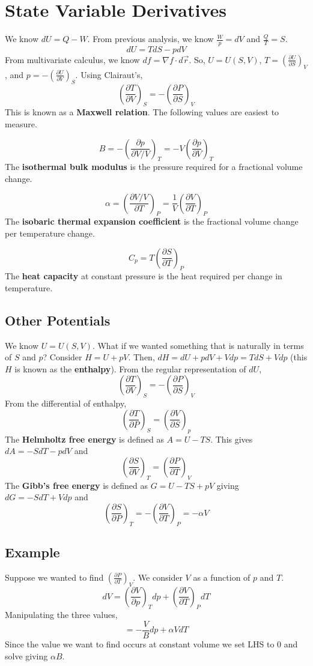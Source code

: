 \documentclass[../main.tex]{subfiles}
\begin{document}
\section{State Variable Derivatives}
We know $dU=Q-W$. From previous analysis, we know $\frac{W}{p}=dV$ and $\frac{Q}{T}=S$.
$$dU=TdS-pdV$$
From multivariate calculus, we know $df=\nabla f\cdot d\vec{r}$. So, $U=U(S,V)$,
$T=\left(\frac{\partial U}{\partial S}\right)_{V}$, and $p=-\left(\frac{\partial U}{\partial V}\right)_{S}$.
Using Clairaut's,
$$\left(\frac{\partial T}{\partial V}\right)_{S}=-\left(\frac{\partial P}{\partial S}\right)_{V}$$
This is known as a \textbf{Maxwell relation}. The following values are easiest to measure.

$$B=-\left(\frac{\partial p}{\partial V/V}\right)_{T}=-V\left(\frac{\partial p}{\partial V}\right)_{T}$$
The \textbf{isothermal bulk modulus} is the pressure required for a fractional volume change.

$$\alpha=\left(\frac{\partial V/V}{\partial T}\right)_{P}=\frac{1}{V}\left(\frac{\partial V}{\partial T}\right)_{P}$$
The \textbf{isobaric thermal expansion coefficient} is the fractional volume change per temperature change.

$$C_{p}=T\left(\frac{\partial S}{\partial T}\right)_{P}$$
The \textbf{heat capacity} at constant pressure is the heat required per change in temperature.

\subsection{Other Potentials}
We know $U=U(S,V)$. What if we wanted something that is naturally in terms of $S$ and $p$? Consider
$H=U+pV$. Then, $dH=dU+pdV+Vdp=TdS+Vdp$ (this $H$ is known as the \textbf{enthalpy}). From the regular representation of $dU$, 
$$\left(\frac{\partial T}{\partial V}\right)_{S}=-\left(\frac{\partial P}{\partial S}\right)_{V}$$
From the differential of enthalpy,
$$\left(\frac{\partial T}{\partial P}\right)_{S}=\left(\frac{\partial V}{\partial S}\right)_{p}$$
The \textbf{Helmholtz free energy} is defined as $A=U-TS$. This gives $dA=-SdT-pdV$ and
$$\left(\frac{\partial S}{\partial V}\right)_{T}=\left(\frac{\partial P}{\partial T}\right)_{V}$$
The \textbf{Gibb's free energy} is defined as $G=U-TS+pV$ giving $dG=-SdT+Vdp$ and
$$\left(\frac{\partial S}{\partial P}\right)_{T}=-\left(\frac{\partial V}{\partial T}\right)_{P}=-\alpha V$$

\subsection{Example}
Suppose we wanted to find $\left(\frac{\partial P}{\partial T}\right)_{V}$. We consider $V$ as a function of $p$ and $T$.
$$dV=\left(\frac{\partial V}{\partial p}\right)_{T}dp+\left(\frac{\partial V}{\partial T}\right)_{P}dT$$
Manipulating the three values,
$$=-\frac{V}{B}dp+\alpha VdT$$
Since the value we want to find occurs at constant volume we set LHS to $0$ and solve giving $\alpha B$.
\end{document}
